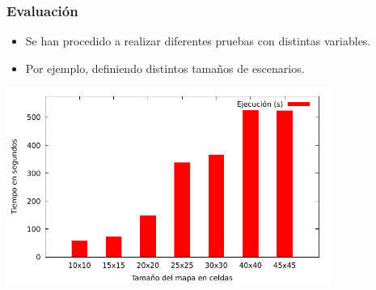 \begin{frame}
\frametitle{Evaluación}

\begin{itemize}
	\item<1-> Se han procedido a realizar diferentes pruebas con distintas variables.
	
	\vspace{1em}
	
	\item<2-> Por ejemplo, definiendo distintos tamaños de escenarios.
\end{itemize}

\vspace{1em}

\pause[3]

\centering
\includegraphics[width=0.8\textwidth]{images/map-size.pdf}

\end{frame}

